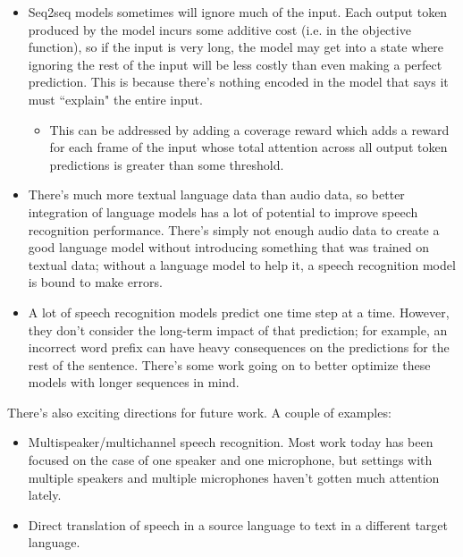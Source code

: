 \begin{itemize}
\begin{itemize}
\end{itemize}
\item Seq2seq models sometimes will ignore much of the input. Each output token produced by the model incurs some additive cost (i.e. in the objective function), so if the input is very long, the model may get into a state where ignoring the rest of the input will be less costly than even making a perfect prediction. This is because there's nothing encoded in the model that says it must ``explain" the entire input.
\begin{itemize}
\item This can be addressed by adding a coverage reward which adds a reward for each frame of the input whose total attention across all output token predictions is greater than some threshold.
\end{itemize}
\item There's much more textual language data than audio data, so better integration of language models has a lot of potential to improve speech recognition performance. There's simply not enough audio data to create a good language model without introducing something that was trained on textual data; without a language model to help it, a speech recognition model is bound to make errors.
\item A lot of speech recognition models predict one time step at a time. However, they don't consider the long-term impact of that prediction; for example, an incorrect word prefix can have heavy consequences on the predictions for the rest of the sentence. There's some work going on to better optimize these models with longer sequences in mind.
\end{itemize}

There's also exciting directions for future work. A couple of examples:
\begin{itemize}
\item Multispeaker/multichannel speech recognition. Most work today has been focused on the case of one speaker and one microphone, but settings with multiple speakers and multiple microphones haven't gotten much attention lately.
\item Direct translation of speech in a source language to text in a different target language.
\end{itemize}
